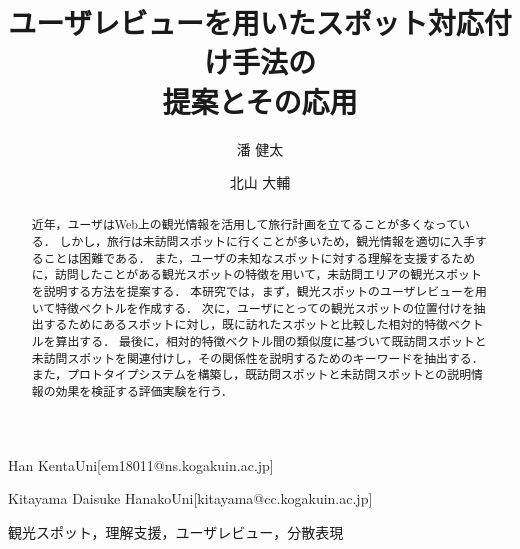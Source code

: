 \documentclass[submit]{ipsj}
\begin{document}
\title{ユーザレビューを用いたスポット対応付け手法の\\提案とその応用}




\author{潘 健太}{Han Kenta}{Uni}[em18011@ns.kogakuin.ac.jp]
\author{北山 大輔}{Kitayama Daisuke Hanako}{Uni}[kitayama@cc.kogakuin.ac.jp]

\begin{abstract}
近年，ユーザはWeb上の観光情報を活用して旅行計画を立てることが多くなっている．
しかし，旅行は未訪問スポットに行くことが多いため，観光情報を適切に入手することは困難である．
また，ユーザの未知なスポットに対する理解を支援するために，訪問したことがある観光スポットの特徴を用いて，未訪問エリアの観光スポットを説明する方法を提案する．
本研究では，まず，観光スポットのユーザレビューを用いて特徴ベクトルを作成する．
次に，ユーザにとっての観光スポットの位置付けを抽出するためにあるスポットに対し，既に訪れたスポットと比較した相対的特徴ベクトルを算出する．
最後に，相対的特徴ベクトル間の類似度に基づいて既訪問スポットと未訪問スポットを関連付けし，その関係性を説明するためのキーワードを抽出する．
また，プロトタイプシステムを構築し，既訪問スポットと未訪問スポットとの説明情報の効果を検証する評価実験を行う．
\end{abstract}


\begin{jkeyword}
観光スポット，理解支援，ユーザレビュー，分散表現
\end{jkeyword}
\end{document}
